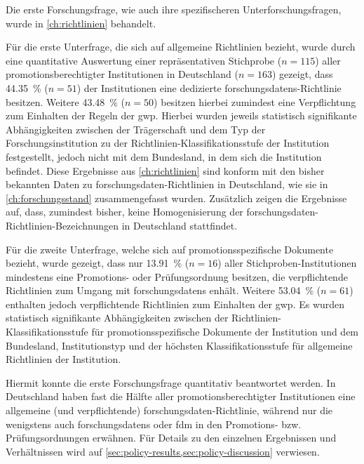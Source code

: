 Die erste Forschungsfrage, wie auch ihre spezifischeren Unterforschungsfragen, wurde in \cref{ch:richtlinien} behandelt.

Für die erste Unterfrage, die sich auf allgemeine Richtlinien bezieht, wurde durch eine quantitative Auswertung einer repräsentativen Stichprobe ($n=\num{115}$) aller promotionsberechtigter Institutionen in Deutschland ($n=\num{163}$) gezeigt, dass \SI{44.35}{\percent} ($n=\num{51}$) der Institutionen eine dedizierte \glspl{forschungsdaten}-Richtlinie besitzen.
Weitere \SI{43.48}{\percent} ($n=\num{50}$) besitzen hierbei zumindest eine Verpflichtung zum Einhalten der Regeln der \gls{gwp}.
Hierbei wurden jeweils statistisch signifikante Abhängigkeiten zwischen der Trägerschaft und dem Typ der Forschungsinstitution zu der Richtlinien-Klassifikationsstufe der Institution festgestellt, jedoch nicht mit dem Bundesland, in dem sich die Institution befindet.
Diese Ergebnisse aus \cref{ch:richtlinien} sind konform mit den bisher bekannten Daten zu \gls{forschungsdaten}-Richtlinien in Deutschland, wie sie in \cref{ch:forschungsstand} zusammengefasst wurden.
Zusätzlich zeigen die Ergebnisse auf, dass, zumindest bisher, keine Homogenisierung der \gls{forschungsdaten}-Richtlinien-Bezeichnungen in Deutschland stattfindet.

Für die zweite Unterfrage, welche sich auf promotionsspezifische Dokumente bezieht, wurde gezeigt, dass nur \SI{13.91}{\percent} ($n=\num{16}$) aller Stichproben-Institutionen mindestens eine Promotions- oder Prüfungsordnung besitzen, die verpflichtende Richtlinien zum Umgang mit \glspl{forschungsdaten} enhält.
Weitere \SI{53.04}{\percent} ($n=\num{61}$) enthalten jedoch verpflichtende Richtlinien zum Einhalten der \gls{gwp}.
Es wurden statistisch signifikante Abhängigkeiten zwischen der Richtlinien-Klassifikationsstufe für promotionsspezifische Dokumente der Institution und dem Bundesland, Institutionstyp und der höchsten Klassifikationsstufe für allgemeine Richtlinien der Institution.

Hiermit konnte die erste Forschungsfrage quantitativ beantwortet werden.
In Deutschland haben fast die Hälfte aller promotionsberechtigter Institutionen eine allgemeine (und verpflichtende) \gls{forschungsdaten}-Richtlinie, während nur die wenigstens auch \glspl{forschungsdaten} oder \gls{fdm} in den Promotions- bzw. Prüfungsordnungen erwähnen.
Für Details zu den einzelnen Ergebnissen und Verhältnissen wird auf \cref{sec:policy-results,sec:policy-discussion} verwiesen.

